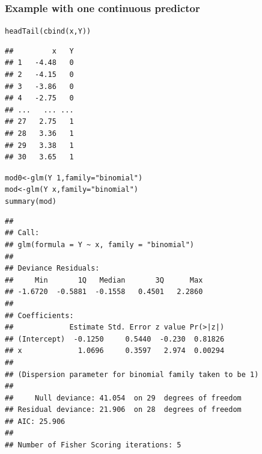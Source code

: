 \documentclass[extsize,handout,10pt]{beamer}\usepackage[]{graphicx}\usepackage[]{color}
\makeatletter
\newcommand{\hlnum}[1]{\textcolor[rgb]{0.502,0.086,1}{#1}}%
\newcommand{\hlstr}[1]{\textcolor[rgb]{1,0.4,0.2}{#1}}%
\newcommand{\hlopt}[1]{\textcolor[rgb]{0.251,0.251,0.251}{#1}}%
\newcommand{\hlstd}[1]{\textcolor[rgb]{0.251,0.251,0.251}{#1}}%
\newcommand{\hlkwb}[1]{\textcolor[rgb]{0,0.439,0.902}{#1}}%
\newcommand{\hlkwc}[1]{\textcolor[rgb]{0.188,0.941,0.314}{#1}}%
\newcommand{\hlkwd}[1]{\textcolor[rgb]{0.69,0.188,0.941}{#1}}%
\newenvironment{kframe}{%
 \def\at@end@of@kframe{}%
 \ifinner\ifhmode%
  \def\at@end@of@kframe{\end{minipage}}%
  \begin{minipage}{\columnwidth}%
 \fi\fi%
 \def\FrameCommand##1{\hskip\@totalleftmargin \hskip-\fboxsep
 \colorbox{shadecolor}{##1}\hskip-\fboxsep
     \hskip-\linewidth \hskip-\@totalleftmargin \hskip\columnwidth}%
 \MakeFramed {\advance\hsize-\width
   \@totalleftmargin\z@ \linewidth\hsize
   \@setminipage}}%
 {\par\unskip\endMakeFramed%
 \at@end@of@kframe}
\newenvironment{knitrout}{}{} %
\makeatother
\begin{document}
\begin{frame}[fragile]
  \frametitle{Example with one continuous predictor}

\begin{knitrout}\tiny
{}\color{fgcolor}\begin{kframe}
\begin{alltt}
\hlkwd{headTail}\hlstd{(}\hlkwd{cbind}\hlstd{(x,Y))}
\end{alltt}
\begin{verbatim}
##         x   Y
## 1   -4.48   0
## 2   -4.15   0
## 3   -3.86   0
## 4   -2.75   0
## ...   ... ...
## 27   2.75   1
## 28   3.36   1
## 29   3.38   1
## 30   3.65   1
\end{verbatim}
\end{kframe}
\end{knitrout}


\begin{knitrout}\tiny
{}\color{fgcolor}\begin{kframe}
\begin{alltt}
\hlstd{mod0}\hlkwb{<-}\hlkwd{glm}\hlstd{(Y}\hlopt{~}\hlnum{1}\hlstd{,}\hlkwc{family}\hlstd{=}\hlstr{"binomial"}\hlstd{)}
\hlstd{mod}\hlkwb{<-}\hlkwd{glm}\hlstd{(Y}\hlopt{~}\hlstd{x,}\hlkwc{family}\hlstd{=}\hlstr{"binomial"}\hlstd{)}
\hlkwd{summary}\hlstd{(mod)}
\end{alltt}
\begin{verbatim}
## 
## Call:
## glm(formula = Y ~ x, family = "binomial")
## 
## Deviance Residuals: 
##     Min       1Q   Median       3Q      Max  
## -1.6720  -0.5881  -0.1558   0.4501   2.2860  
## 
## Coefficients:
##             Estimate Std. Error z value Pr(>|z|)
## (Intercept)  -0.1250     0.5440  -0.230  0.81826
## x             1.0696     0.3597   2.974  0.00294
## 
## (Dispersion parameter for binomial family taken to be 1)
## 
##     Null deviance: 41.054  on 29  degrees of freedom
## Residual deviance: 21.906  on 28  degrees of freedom
## AIC: 25.906
## 
## Number of Fisher Scoring iterations: 5
\end{verbatim}
\end{kframe}
\end{knitrout}

\end{frame}
\end{document}

